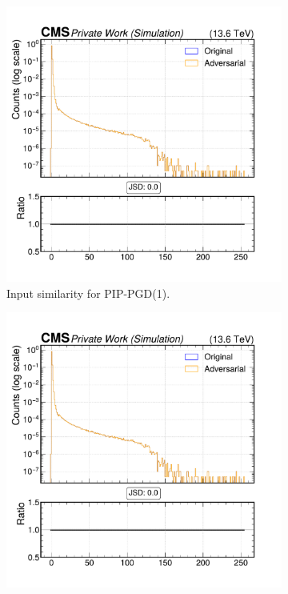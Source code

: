 \begin{figure}[h]
  \centering
  \begin{subfigure}[t]{0.32\textwidth}
    \includegraphics[width=\linewidth]{media/output/features/compare/combined_it_1/cmp_cpf_arr_Cpfcan_chi2.pdf}
    \caption*{Input similarity for PIP-PGD(1).}
  \end{subfigure}\hfill
  \begin{subfigure}[t]{0.32\textwidth}
    \includegraphics[width=\linewidth]{media/output/features/compare/combined_it_2/cmp_cpf_arr_Cpfcan_chi2.pdf}

\end{subfigure}
\end{figure}
